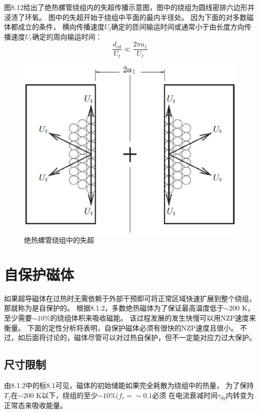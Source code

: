图8.12给出了绝热螺管绕组内的失超传播示意图，图中的绕组为圆线密排六边形并浸渍了环氧。
图中的失超开始于绕组中平面的最内半径处。
因为下面的对多数磁体都成立的条件，
横向传播速度$U_t$确定的匝间输运时间或通常小于由长度方向传播速度$U_\ell$确定的周向输运时间：
\begin{equation}%
\frac{d_{cd}}{U_t}\ll\frac{2\pi a_1}{U_\ell}
\end{equation}

\begin{figure}
	\centering
	\includegraphics[scale=0.5]{chpt8/figs/fig8.12.eps}
	\caption{绝热螺管绕组中的失超}
\end{figure}

\section{自保护磁体}
如果超导磁体在过热时无需依赖于外部干预即可将正常区域快速扩展到整个绕组，那就称为是自保护的。
根据8.1.2，多数绝热磁体为了保证最高温度低于$\sim 200$ K，至少需要$\sim 10\%$的绕组体积来吸收磁能。
该过程发展的发生快慢可以用NZP速度来衡量。
下面的定性分析将表明，自保护磁体必须有很快的NZP速度且很小。
不过，如后面将讨论的，磁体尽管可以对过热自保护，但不一定能对应力过大保护。

\subsection{尺寸限制}
由8.1.2中的标8.1可见，磁体的初始储能如果完全耗散为绕组中的热量，
为了保持$T_f$在$\sim$200 K以下，绕组的至少$\sim 10\%$($f_r=\sim 0.1$必须
在电流衰减时间$\tau_{dg}$内转变为正常态来吸收能量。

